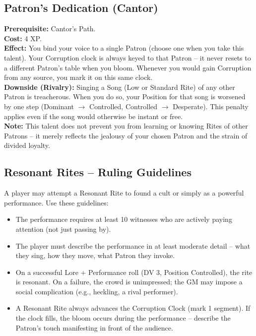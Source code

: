 \subsection*{Patron’s Dedication (Cantor)}
\label{talent:patron_dedication}
\textbf{Prerequisite:} Cantor’s Path. \\
\textbf{Cost:} 4 XP. \\
\textbf{Effect:} You bind your voice to a single Patron (choose one when you take this talent). Your Corruption clock is always keyed to that Patron – it never resets to a different Patron’s table when you bloom. Whenever you would gain Corruption from any source, you mark it on this same clock. \\
\textbf{Downside (Rivalry):} Singing a Song (Low or Standard Rite) of any other Patron is treacherous. When you do so, your Position for that song is worsened by one step (Dominant $\rightarrow$ Controlled, Controlled $\rightarrow$ Desperate). This penalty applies even if the song would otherwise be instant or free. \\
\textbf{Note:} This talent does not prevent you from learning or knowing Rites of other Patrons – it merely reflects the jealousy of your chosen Patron and the strain of divided loyalty.

\subsection*{Resonant Rites – Ruling Guidelines}
\label{subsec:resonant-rites-gm}
A player may attempt a Resonant Rite to found a cult or simply as a powerful performance. Use these guidelines:
\begin{itemize}
  \item The performance requires at least 10 witnesses who are actively paying attention (not just passing by).
  \item The player must describe the performance in at least moderate detail – what they sing, how they move, what Patron they invoke.
  \item On a successful Lore + Performance roll (DV 3, Position Controlled), the rite is resonant. On a failure, the crowd is unimpressed; the GM may impose a social complication (e.g., heckling, a rival performer).
  \item A Resonant Rite always advances the Corruption Clock (mark 1 segment). If the clock fills, the bloom occurs during the performance – describe the Patron’s touch manifesting in front of the audience.
\end{itemize}

